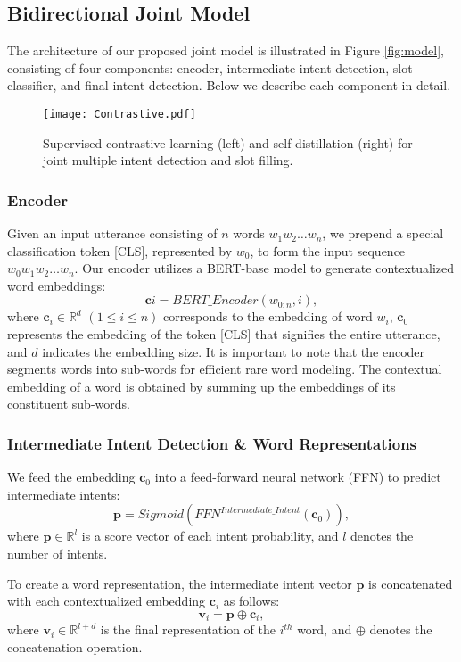 \documentclass{ecai}
\begin{document}
\subsection{Bidirectional Joint Model}
The architecture of our proposed joint model is illustrated in Figure \ref{fig:model}, consisting of four components: encoder, intermediate intent detection, slot classifier, and final intent detection. Below we describe each component in detail. 

\begin{figure*}[t]
	\begin{center}
		\texttt{[image: Contrastive.pdf]}
	\end{center}
	\vspace{-8pt}
		\caption{Supervised contrastive learning (left) and self-distillation (right) for joint multiple intent detection and slot filling.}
	\label{fig:loss}
\end{figure*}

\subsubsection{Encoder}
Given an input utterance consisting of $n$ words $w_1w_2 \ldots w_n$, we prepend a special classification token [CLS], represented by $w_0$, to form the input sequence $w_0w_1w_2 \ldots w_n$. Our encoder utilizes a BERT-base model \cite{Devlin:2019} to generate contextualized word embeddings:
$$\textbf{c}i = BERT\_Encoder(w_{0:n}, i),$$
where $\textbf{c}_i\in \mathbb{R}^d$ $(1 \leq i \leq n)$ corresponds to the embedding of word $w_i$, $\textbf{c}_0$ represents the embedding of the token [CLS] that signifies the entire utterance, and $d$ indicates the embedding size. It is important to note that the encoder segments words into sub-words for efficient rare word modeling. The contextual embedding of a word is obtained by summing up the embeddings of its constituent sub-words.

\subsubsection{Intermediate Intent Detection \& Word Representations}
We feed the embedding $\textbf{c}_0$ into a feed-forward neural network (FFN) to predict intermediate intents: 
$$\textbf{p}= Sigmoid(FFN^{Intermediate\_Intent}(\textbf{c}_0)),$$
where $\textbf{p} \in \mathbb{R}^l$ is a score vector of each intent probability, and $l$ denotes the number of intents. 

To create a word representation, the intermediate intent vector $\textbf{p}$ is concatenated with each contextualized embedding $\textbf{c}_i$ as follows:
$$\textbf{v}_i= \textbf{p}\oplus \textbf{c}_i,$$
where $\textbf{v}_i\in \mathbb{R}^{l+d}$ is the final representation of the $i^{th}$ word, and $\oplus$ denotes the concatenation operation.
\end{document}
